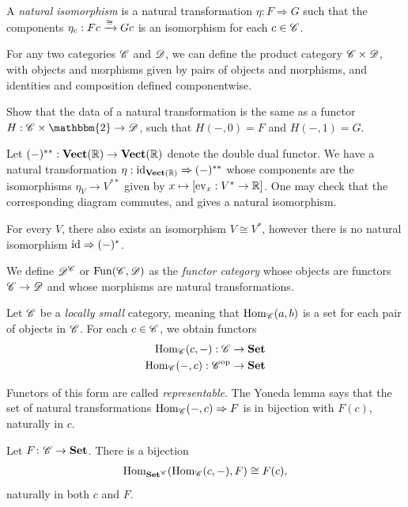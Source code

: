 \documentclass{article}[11pt]
\begin{document}
\begin{definition} A \textit{natural isomorphism} is a natural transformation $\eta: F \Rightarrow G$ such that the components $\eta_c : Fc \xrightarrow{\cong} Gc$ is an isomorphism for each $c\in \mathscr{C}$.
\end{definition}


For any two categories $\mathscr{C}$ and $\mathscr{D}$, we can define the product category $\mathscr{C}\times \mathscr{D}$, with objects and morphisms given by pairs of objects and morphisms, and identities and composition defined componentwise. 

\begin{exercise}\label{} Show that the data of a natural transformation is the same as a functor $H : \C\times\mathbbm{2} \to \D$, such that $H(-,0)=F$ and $H(-,1) = G$. 
\end{exercise}


\begin{example} Let $(-)^{\ast\ast} : \textbf{Vect}(\mathbb{R}) \to \textbf{Vect}(\mathbb{R})$ denote the double dual functor. We have a natural transformation $\eta : \text{id}_{\textbf{Vect}(\mathbb{R})} \Rightarrow (-)^{\ast\ast}$ whose components are the isomorphisms $\eta_V \to V^{\ast\ast}$ given by $x\mapsto [\text{ev}_x : V^\ast \to \mathbb{R}]$. One may check that the corresponding diagram commutes, and gives a natural isomorphism.
\end{example}

\begin{remark} For every $V$, there also exists an isomorphism $V\cong V^\ast$, however there is no natural isomorphism $\text{id} \Rightarrow (-)^\ast$.
\end{remark}

\begin{definition} We define $\mathscr{D}^{\mathscr{C}}$ or $\text{Fun}(\mathscr{C},\mathscr{D})$ as the \textit{functor category} whose objects are functors $\mathscr{C}\to \mathscr{D}$ and whose morphisms are natural transformations.
\end{definition}

Let $\mathscr{C}$ be a \textit{locally small} category, meaning that $\textup{Hom}_{\mathscr{C}}(a,b)$ is a set for each pair of objects in $\mathscr{C}$. For each $c\in \mathscr{C}$, we obtain functors
\begin{align*}
	\textup{Hom}_{\mathscr{C}} (c,-) : \mathscr{C} &\to \textbf{Set} \\
	\textup{Hom}_{\mathscr{C}}(-,c) : \mathscr{C}^{\text{op}} &\to \textbf{Set}
\end{align*}

Functors of this form are called \emph{representable}. The Yoneda lemma says that the set of natural transformations
$\textup{Hom}_{\mathscr{C}}(-,c)\Rightarrow F$ is in bijection with $F(c)$, naturally
in $c$.
\begin{lemma} Let $F\colon \mathscr{C} \to \textbf{Set}$. There is a bijection
\begin{align*}
	\textup{Hom}_{\textbf{Set}^{\mathscr{C}}}(\textup{Hom}_{\mathscr{C}} (c,-), F) \cong F(c),
\end{align*}
naturally in both $c$ and $F$.
\end{lemma}
\end{document}
